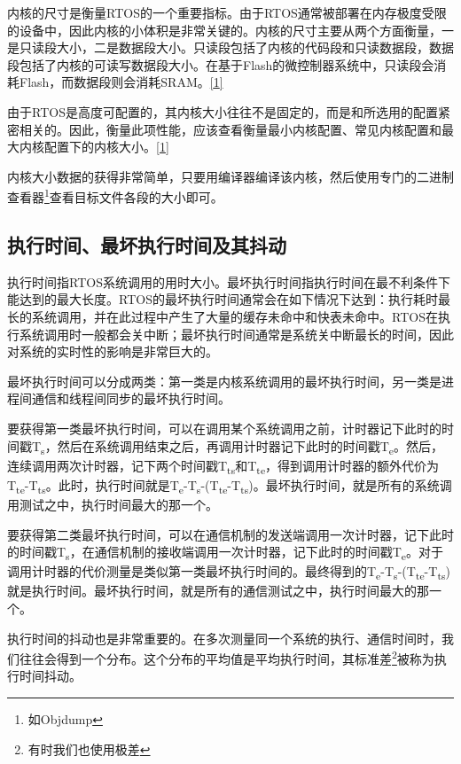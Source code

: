 内核的尺寸是衡量RTOS的一个重要指标。由于RTOS通常被部署在内存极度受限的设备中，因此内核的小体积是非常关键的。内核的尺寸主要从两个方面衡量，一是只读段大小，二是数据段大小。只读段包括了内核的代码段和只读数据段，数据段包括了内核的可读写数据段大小。在基于Flash的微控制器系统中，只读段会消耗Flash，而数据段则会消耗SRAM。\hyperref[cite:1-1]{{[}1{]}}

由于RTOS是高度可配置的，其内核大小往往不是固定的，而是和所选用的配置紧密相关的。因此，衡量此项性能，应该查看衡量最小内核配置、常见内核配置和最大内核配置下的内核大小。\hyperref[cite:1-1]{{[}1{]}}

内核大小数据的获得非常简单，只要用编译器编译该内核，然后使用专门的二进制查看器\footnote{如Objdump}查看目标文件各段的大小即可。

\subsection{执行时间、最坏执行时间及其抖动}\label{subsec:1-execution-time-and-jitter}

执行时间指RTOS系统调用的用时大小。最坏执行时间指执行时间在最不利条件下能达到的最大长度。RTOS的最坏执行时间通常会在如下情况下达到：执行耗时最长的系统调用，并在此过程中产生了大量的缓存未命中和快表未命中。RTOS在执行系统调用时一般都会关中断；最坏执行时间通常是系统关中断最长的时间，因此对系统的实时性的影响是非常巨大的。

最坏执行时间可以分成两类：第一类是内核系统调用的最坏执行时间，另一类是进程间通信和线程间同步的最坏执行时间。

要获得第一类最坏执行时间，可以在调用某个系统调用之前，计时器记下此时的时间戳T\textsubscript{s}，然后在系统调用结束之后，再调用计时器记下此时的时间戳T\textsubscript{e}。然后，连续调用两次计时器，记下两个时间戳T\textsubscript{ts}和T\textsubscript{te}，得到调用计时器的额外代价为T\textsubscript{te}-T\textsubscript{ts}。此时，执行时间就是T\textsubscript{e}-T\textsubscript{s}-(T\textsubscript{te}-T\textsubscript{ts})。最坏执行时间，就是所有的系统调用测试之中，执行时间最大的那一个。

要获得第二类最坏执行时间，可以在通信机制的发送端调用一次计时器，记下此时的时间戳T\textsubscript{s}，在通信机制的接收端调用一次计时器，记下此时的时间戳T\textsubscript{e}。对于调用计时器的代价测量是类似第一类最坏执行时间的。最终得到的T\textsubscript{e}-T\textsubscript{s}-(T\textsubscript{te}-T\textsubscript{ts})就是执行时间。最坏执行时间，就是所有的通信测试之中，执行时间最大的那一个。

执行时间的抖动也是非常重要的。在多次测量同一个系统的执行、通信时间时，我们往往会得到一个分布。这个分布的平均值是平均执行时间，其标准差\footnote{有时我们也使用极差}被称为执行时间抖动。

